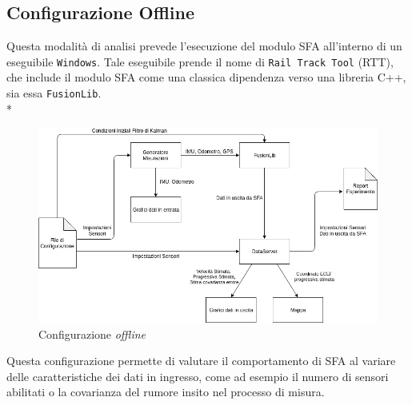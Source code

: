 \subsection{Configurazione Offline}
Questa modalit\`a di analisi prevede l'esecuzione del modulo SFA all'interno di un eseguibile \texttt{Windows}. Tale eseguibile prende il nome di \texttt{Rail Track Tool} (RTT), che include il modulo SFA come una classica dipendenza verso una libreria C++, sia essa \texttt{FusionLib}.\\*
\begin{figure}[h]
	\centering
	\includegraphics[width=0.9\linewidth]{img/rtt}
	\caption{Configurazione \emph{offline}}
	\label{fig:rtt}
\end{figure}\clearpage
Questa configurazione permette di valutare il comportamento di SFA al variare delle caratteristiche dei dati in ingresso, come ad esempio il numero di sensori abilitati o la covarianza del rumore insito nel processo di misura.